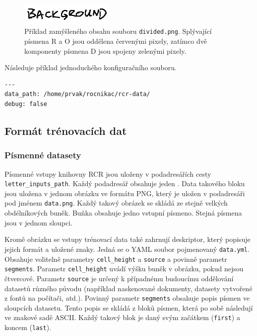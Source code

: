 \documentclass[a4paper]{article}
\begin{document}
\begin{figure}[h]
	\centering
	\includegraphics[width=0.4\textwidth]{divided_sample}
	\caption{Příklad zamýšleného obsahu souboru
	\texttt{divided.png}. Splývající písmena R a O jsou
	oddělena červenými pixely, zatímco dvě komponenty
	písmena D jsou spojeny zelenými pixely.}
\end{figure}

Následuje příklad jednoduchého konfiguračního souboru.
\begin{lstlisting}
---
data_path: /home/prvak/rocnikac/rcr-data/
debug: false
\end{lstlisting}

\subsection{Formát trénovacích dat}
\subsubsection{Písmenné datasety}
Písmenné vstupy knihovny RCR jsou uloženy v podadresářích
cesty \texttt{letter\_inputs\_path}. Každý podadresář obsahuje jeden . Data takového bloku jsou uložena v jednom obrázku ve formátu PNG,
který je uložen v podadresáři  pod jménem \texttt{data.png}.
Každý takový obrázek se skládá ze stejně velkých obdélníkových buněk. Buňka
obsahuje jedno vstupní písmeno. Stejná písmena jsou v jednom sloupci.

Kromě obrázku se vstupy trénovací data také zahrnují deskriptor, který popisuje
jejich formát a uložené znaky. Jedná se o YAML soubor pojmenovaný
\texttt{data.yml}. Obsahuje volitelně parametry \texttt{cell\_height} a
\texttt{source} a povinně parametr \texttt{segments}.
Parametr \texttt{cell\_height} uvádí výšku buněk v obrázku, pokud nejsou
čtvercové. Parametr \texttt{source} je určený k případnému budoucímu oddělování
datasetů různého původu (například naskenované dokumenty, datasety vytvořené
z fontů na počítači, atd.).
Povinný parametr \texttt{segments} obsahuje popis písmen ve sloupcích datasetu.
Tento popis se skládá z bloků písmen, která po sobě následují ve znakové sadě
ASCII. Každý takový blok je daný svým začátkem (\texttt{first}) a koncem
(\texttt{last}).
\end{document}
